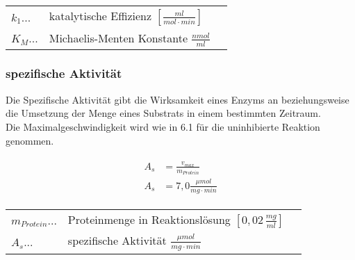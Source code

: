 \begin{table}[H]
  \begin{tabular}{lll}
    $k_{1}$...& katalytische Effizienz $[\frac{ml}{mol \cdot min}]$ & \\
    $K_M$... & Michaelis-Menten Konstante $\frac{nmol}{ml}$ \\
  \end{tabular}
\end{table}

\subsubsection{spezifische Aktivität}
Die Spezifische Aktivität gibt die Wirksamkeit eines Enzyms an beziehungsweise die Umsetzung der Menge eines Substrats in einem bestimmten Zeitraum. \\
Die Maximalgeschwindigkeit wird wie in 6.1 für die uninhibierte Reaktion genommen. 

\begin{align}
  \begin{split} 
    A_s &= \frac{v_{max}}{m_{Protein}} \\
    A_s &= 7,0 \frac{\mu mol}{mg \cdot min}
  \end{split}
\end{align}

\begin{table}[H]
  \begin{tabular}{lll}
    $m_{Protein}$...& Proteinmenge in Reaktionslösung $[0,02 \, \frac{mg}{ml}]$ & \\
    $A_s$... & spezifische Aktivität $\frac{\mu mol}{mg \cdot min}$ \\
  \end{tabular}
\end{table}
